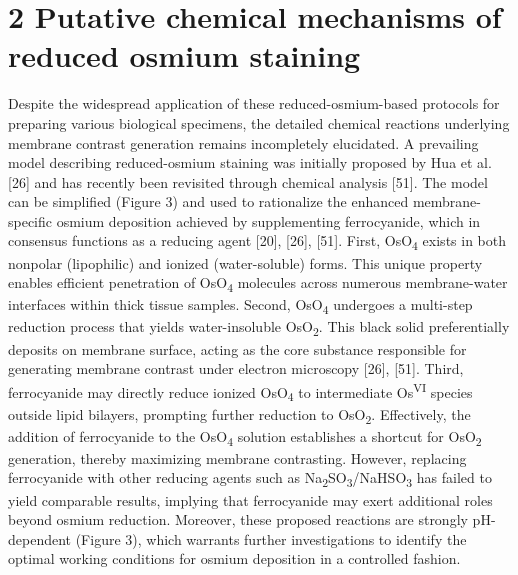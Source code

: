 \documentclass{article}
\begin{document}
\section*{2 Putative chemical mechanisms of reduced osmium staining}

\noindent Despite the widespread application of these reduced-osmium-based protocols for preparing various biological specimens, the detailed chemical reactions underlying membrane contrast generation remains incompletely elucidated. A prevailing model describing reduced-osmium staining was initially proposed by Hua et al. [26] and has recently been revisited through chemical analysis [51]. The model can be simplified (Figure 3) and used to rationalize the enhanced membrane-specific osmium deposition achieved by supplementing ferrocyanide, which in consensus functions as a reducing agent [20], [26], [51]. First, OsO\textsubscript{4} exists in both nonpolar (lipophilic) and ionized (water-soluble) forms. This unique property enables efficient penetration of OsO\textsubscript{4} molecules across numerous membrane-water interfaces within thick tissue samples. Second, OsO\textsubscript{4} undergoes a multi-step reduction process that yields water-insoluble OsO\textsubscript{2}. This black solid preferentially deposits on membrane surface, acting as the core substance responsible for generating membrane contrast under electron microscopy [26], [51]. Third, ferrocyanide may directly reduce ionized OsO\textsubscript{4} to intermediate Os\textsuperscript{VI} species outside lipid bilayers, prompting further reduction to OsO\textsubscript{2}. Effectively, the addition of ferrocyanide to the OsO\textsubscript{4} solution establishes a shortcut for OsO\textsubscript{2} generation, thereby maximizing membrane contrasting. However, replacing ferrocyanide with other reducing agents such as Na\textsubscript{2}SO\textsubscript{3}/NaHSO\textsubscript{3} has failed to yield comparable results, implying that ferrocyanide may exert additional roles beyond osmium reduction. Moreover, these proposed reactions are strongly pH-dependent (Figure 3), which warrants further investigations to identify the optimal working conditions for osmium deposition in a controlled fashion.
\end{document}
